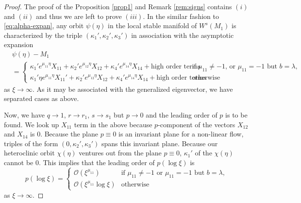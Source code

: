 \documentclass[a4paper,11pt]{article}
\def\BO{{\mathcal{O}}}
\theoremstyle{remark}
\begin{document}
\begin{proof}
The proof of the Proposition \ref{prop1} and Remark \ref{rem:signs} contains $(i)$ and $(ii)$ and thus we are left to prove $(iii)$. In the similar fashion to \eqref{eq:alpha-expan}, any orbit $\psi(\eta)$ in the local stable manifold of $W^s(M_1)$ is characterized by the triple $(\kappa_1',\kappa_2',\kappa_3')$ in association with the asymptotic expansion
\begin{equation}
\begin{aligned}
 &\psi(\eta) -M_1\\
 &= \begin{cases} \kappa_1'e^{\mu_{11}\eta}X_{11} + \kappa_2'e^{\mu_{12}\eta}X_{12} + \kappa_4'e^{\mu_{14}\eta}X_{14} + \text{high order terms} & \text{if $\mu_{11}\ne-1$, or $\mu_{11}=-1$ but $b=\lambda$,}\\
 \kappa_1'\eta e^{\mu_{11}\eta}X_{11}' + \kappa_2'e^{\mu_{12}\eta}X_{12} + \kappa_4'e^{\mu_{14}\eta}X_{14} + \text{high order terms} & \text{otherwise }
 \end{cases}
\end{aligned}
\end{equation}
as $\xi \rightarrow \infty$. As it may be associated with the generalized eigenvector, we have separated cases as above.

Now, we have $q \rightarrow 1$, $r \rightarrow r_1$, $s \rightarrow s_1$ but $p \rightarrow 0$ and the leading order of $p$ is to be found. We look up  $X_{11}$ term in the above because $p$-component of the vectors $X_{12}$ and $X_{14}$ is $0$. Because the plane $p\equiv0$ is an invariant plane for a non-linear flow, triples of the form $(0,\kappa_2',\kappa_3')$ spans this invariant plane. Because our heteroclinic orbit $\chi(\eta)$ ventures out from the plane $p\equiv0$, $\kappa_1'$ of the $\chi(\eta)$ cannot be $0$.
This implies that the leading order of $p(\log\xi)$ is
$$p(\log\xi) = \begin{cases} \BO(\xi^{\mu_{11}}) & \text{if $\mu_{11}\ne-1$ or $\mu_{11}=-1$ but $b=\lambda$,}\\
 \BO(\xi^{\mu_{11}}\log\xi) & \text{otherwise}
 \end{cases}
 $$
as $\xi \rightarrow \infty$.


\end{proof}
\end{document}
